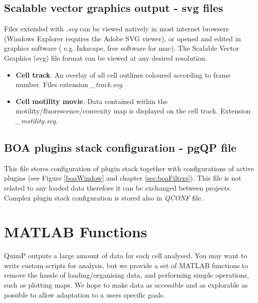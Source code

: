 \documentclass[a4paper,12pt]{article}
\begin{document}
\subsection{Scalable vector graphics output - svg files}

Files extended with
\textit{.svg} can be viewed natively in most internet browsers (Windows Explorer requires the Adobe SVG viewer), or opened and edited
in graphics software ( e.g. Inkscape, free software for mac).  The 
Scalable Vector Graphics (svg) file format can be viewed at any desired resolution. 

\begin{itemize}

\item \textbf{Cell track}.  An overlay of all cell outlines coloured according to frame number. Files extension \textit{\_track.svg}.

\item \textbf{Cell motility movie}.  Data contained within the motility/fluorescence/convexity map is displayed on the cell track. Extension \textit{\_motility.svg}.

\end{itemize}

\subsection{BOA plugins stack configuration - pgQP file}

This file stores configuration of plugin stack together with configurations of active plugins (see Figure \ref{boaWindow} and chapter \ref{sec:boaFilters}). This file is not related to any loaded data therefore it can be exchanged between projects. Complex plugin stack configuration is stored also in \textit{QCONF} file. 



\section{MATLAB Functions}
\label{matlab}

QuimP outputs a large amount of data for each cell analysed.
You may want to write custom scripts for analysis, but we provide
a set of MATLAB functions to remove the hassle of loading/organising data, and performing
simple operations, such as plotting maps.
We hope to make data as accessible and as explorable as possible to allow adaptation to a users specific goals.
\end{document}
